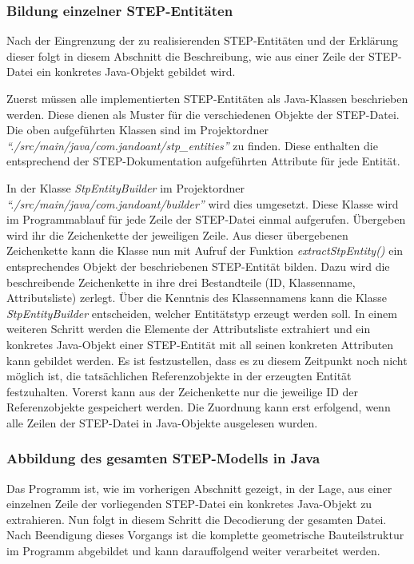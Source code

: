 \subsubsection{Bildung einzelner STEP-Entitäten}
\label{sec:string2entity}


Nach der Eingrenzung der zu realisierenden STEP-Entitäten und der Erklärung dieser folgt in diesem Abschnitt die Beschreibung, wie aus einer Zeile der STEP-Datei ein konkretes Java-Objekt gebildet wird. 

Zuerst müssen alle implementierten STEP-Entitäten als Java-Klassen beschrieben werden. Diese dienen als Muster für die verschiedenen Objekte der STEP-Datei. Die oben aufgeführten Klassen sind im Projektordner \textit{"`./src/main/java/com.jandoant/stp\_entities"'} zu finden. Diese enthalten die entsprechend der STEP-Dokumentation aufgeführten Attribute für jede Entität. 

In der Klasse \textit{StpEntityBuilder} im Projektordner \textit{"`./src/main/java/com.jandoant/builder"'} wird dies umgesetzt. Diese Klasse wird im Programmablauf für jede Zeile der STEP-Datei einmal aufgerufen. Übergeben wird ihr die Zeichenkette der jeweiligen Zeile. Aus dieser übergebenen Zeichenkette kann die Klasse nun mit Aufruf der Funktion \textit{extractStpEntity()} ein entsprechendes Objekt der beschriebenen STEP-Entität bilden. 
Dazu wird die beschreibende Zeichenkette in ihre drei Bestandteile (ID, Klassenname, Attributsliste) zerlegt. Über die Kenntnis des Klassennamens kann die Klasse \textit{StpEntityBuilder} entscheiden, welcher Entitätstyp erzeugt werden soll. In einem weiteren Schritt werden die Elemente der Attributsliste extrahiert und ein konkretes Java-Objekt einer STEP-Entität mit all seinen konkreten Attributen kann gebildet werden. Es ist festzustellen, dass es zu diesem Zeitpunkt noch nicht möglich ist, die tatsächlichen Referenzobjekte in der erzeugten Entität festzuhalten. Vorerst kann aus der Zeichenkette nur die jeweilige ID der Referenzobjekte gespeichert werden. Die Zuordnung kann erst erfolgend, wenn alle Zeilen der STEP-Datei in Java-Objekte ausgelesen wurden.

\subsubsection{Abbildung des gesamten STEP-Modells in Java} 

Das Programm ist, wie im vorherigen Abschnitt gezeigt, in der Lage, aus einer einzelnen Zeile der vorliegenden STEP-Datei ein konkretes Java-Objekt zu extrahieren. Nun folgt in diesem Schritt die Decodierung der gesamten Datei. Nach Beendigung dieses Vorgangs ist die komplette geometrische Bauteilstruktur im Programm abgebildet und kann darauffolgend weiter verarbeitet werden.

